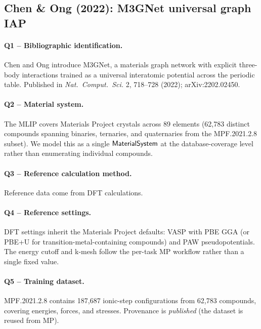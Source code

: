 \subsection{Chen \& Ong (2022): M3GNet universal graph IAP}
\label{sec:appendix-example-chen2022}

\paragraph{Q1 -- Bibliographic identification.}
Chen and Ong introduce M3GNet, a materials graph network with explicit
three-body interactions trained as a universal interatomic potential
across the periodic table. Published in \emph{Nat.\ Comput.\ Sci.} 2,
718--728 (2022); arXiv:2202.02450.


\paragraph{Q2 -- Material system.}
The MLIP covers Materials Project crystals across 89 elements
(62{,}783 distinct compounds spanning binaries, ternaries, and
quaternaries from the MPF.2021.2.8 subset). We model this as a single
$\mathsf{MaterialSystem}$ at the database-coverage level rather than
enumerating individual compounds.


\paragraph{Q3 -- Reference calculation method.}
Reference data come from DFT calculations.


\paragraph{Q4 -- Reference settings.}
DFT settings inherit the Materials Project defaults: VASP with PBE
GGA (or PBE+U for transition-metal-containing compounds) and PAW
pseudopotentials. The energy cutoff and k-mesh follow the per-task MP
workflow rather than a single fixed value.


\paragraph{Q5 -- Training dataset.}
MPF.2021.2.8 contains 187{,}687 ionic-step configurations from 62{,}783
compounds, covering energies, forces, and stresses. Provenance is
\emph{published} (the dataset is reused from MP).


